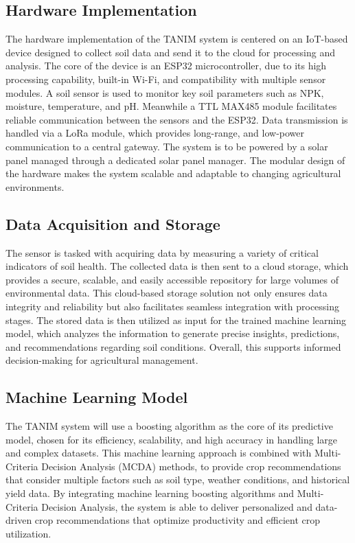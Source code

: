 {	\subsection{Hardware Implementation}
	The hardware implementation of the TANIM system is centered on an IoT-based device designed to collect soil data and send it to the cloud for processing and analysis. The core of the device is an ESP32 microcontroller, due to its high processing capability, built-in Wi-Fi, and compatibility with multiple sensor modules.  A soil sensor is used to monitor key soil parameters such as NPK, moisture, temperature, and pH. Meanwhile a TTL MAX485 module facilitates reliable communication between the sensors and the ESP32. Data transmission is handled via a LoRa module, which provides long-range, and low-power communication to a central gateway. The system is to be powered by a solar panel managed through a dedicated solar panel manager. The modular design of the hardware makes the system scalable and adaptable to changing agricultural environments.
	
	\subsection{Data Acquisition and Storage}
	The sensor is tasked with acquiring data by measuring a variety of critical indicators of soil health. The collected data is then sent to a cloud storage, which provides a secure, scalable, and easily accessible repository for large volumes of environmental data. This cloud-based storage solution not only ensures data integrity and reliability but also facilitates seamless integration with processing stages. The stored data is then utilized as input for the trained machine learning model, which analyzes the information to generate precise insights, predictions, and recommendations regarding soil conditions. Overall, this supports informed decision-making for agricultural management.
	
	\subsection{Machine Learning Model}
	The TANIM system will use a boosting algorithm as the core of its predictive model, chosen for its efficiency, scalability, and high accuracy in handling large and complex datasets. This machine learning approach is combined with Multi-Criteria Decision Analysis (MCDA) methods, to provide crop recommendations that consider multiple factors such as soil type, weather conditions, and historical yield data. By integrating machine learning boosting algorithms and Multi-Criteria Decision Analysis, the system is able to deliver personalized and data-driven crop recommendations that optimize productivity and efficient crop utilization.
	
}
